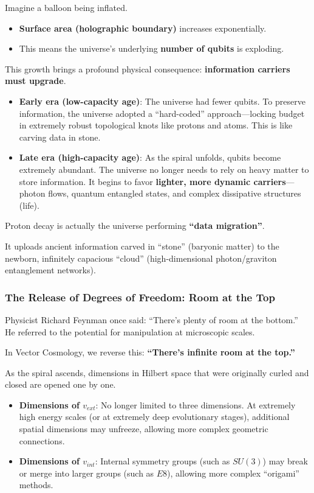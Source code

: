 Imagine a balloon being inflated.

\begin{itemize}
\item \textbf{Surface area (holographic boundary)} increases exponentially.

\item This means the universe's underlying \textbf{number of qubits} is exploding.
\end{itemize}

This growth brings a profound physical consequence: \textbf{information carriers must upgrade}.

\begin{itemize}
\item \textbf{Early era (low-capacity age)}: The universe had fewer qubits. To preserve information, the universe adopted a ``hard-coded'' approach---locking budget in extremely robust topological knots like protons and atoms. This is like carving data in stone.

\item \textbf{Late era (high-capacity age)}: As the spiral unfolds, qubits become extremely abundant. The universe no longer needs to rely on heavy matter to store information. It begins to favor \textbf{lighter, more dynamic carriers}---photon flows, quantum entangled states, and complex dissipative structures (life).
\end{itemize}

Proton decay is actually the universe performing \textbf{``data migration''}.

It uploads ancient information carved in ``stone'' (baryonic matter) to the newborn, infinitely capacious ``cloud'' (high-dimensional photon/graviton entanglement networks).

\subsubsection{The Release of Degrees of Freedom: Room at the Top}

Physicist Richard Feynman once said: ``There's plenty of room at the bottom.'' He referred to the potential for manipulation at microscopic scales.

In Vector Cosmology, we reverse this: \textbf{``There's infinite room at the top.''}

As the spiral ascends, dimensions in Hilbert space that were originally curled and closed are opened one by one.

\begin{itemize}
\item \textbf{Dimensions of $v_{ext}$}: No longer limited to three dimensions. At extremely high energy scales (or at extremely deep evolutionary stages), additional spatial dimensions may unfreeze, allowing more complex geometric connections.

\item \textbf{Dimensions of $v_{int}$}: Internal symmetry groups (such as $SU(3)$) may break or merge into larger groups (such as $E8$), allowing more complex ``origami'' methods.
\end{itemize}

